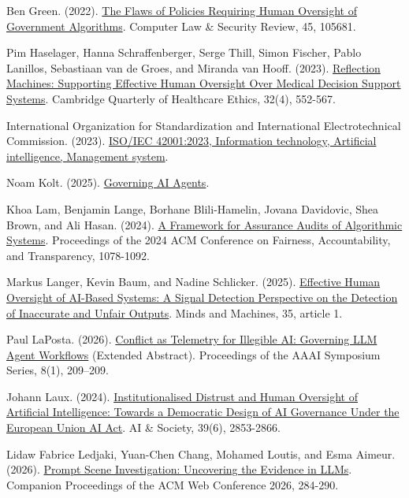\documentclass[11pt]{article}
\newenvironment{TAEReferences}{%
  \begin{list}{}{%
    \renewcommand{\makelabel}[1]{}%
    \setlength{\labelwidth}{0pt}%
    \setlength{\labelsep}{0pt}%
    \setlength{\leftmargin}{0.5in}%
    \setlength{\itemindent}{-0.5in}%
    \setlength{\itemsep}{0.45em}%
    \setlength{\parsep}{0pt}%
    \setlength{\topsep}{0.25em}%
  }%
}{\end{list}}
\begin{document}
\begin{TAEReferences}
\item{}\label{reference-16} Ben Green. (2022). \href{https://doi.org/10.1016/j.clsr.2022.105681}{The Flaws of Policies Requiring Human Oversight of Government Algorithms}. Computer Law \& Security Review, 45, 105681.
\item{}\label{reference-17} Pim Haselager, Hanna Schraffenberger, Serge Thill, Simon Fischer, Pablo Lanillos, Sebastiaan van de Groes, and Miranda van Hooff. (2023). \href{https://doi.org/10.1017/S0963180122000718}{Reflection Machines: Supporting Effective Human Oversight Over Medical Decision Support Systems}. Cambridge Quarterly of Healthcare Ethics, 32(4), 552-567.
\item{}\label{reference-18} International Organization for Standardization and International Electrotechnical Commission. (2023). \href{https://www.iso.org/standard/42001}{ISO/IEC 42001:2023, Information technology, Artificial intelligence, Management system}.
\item{}\label{reference-19} Noam Kolt. (2025). \href{https://arxiv.org/abs/2501.07913}{Governing AI Agents}.
\item{}\label{reference-20} Khoa Lam, Benjamin Lange, Borhane Blili-Hamelin, Jovana Davidovic, Shea Brown, and Ali Hasan. (2024). \href{https://doi.org/10.1145/3630106.3658957}{A Framework for Assurance Audits of Algorithmic Systems}. Proceedings of the 2024 ACM Conference on Fairness, Accountability, and Transparency, 1078-1092.
\item{}\label{reference-21} Markus Langer, Kevin Baum, and Nadine Schlicker. (2025). \href{https://doi.org/10.1007/s11023-024-09701-0}{Effective Human Oversight of AI-Based Systems: A Signal Detection Perspective on the Detection of Inaccurate and Unfair Outputs}. Minds and Machines, 35, article 1.
\item{}\label{reference-22} Paul LaPosta. (2026). \href{https://doi.org/10.1609/aaaiss.v8i1.42543}{Conflict as Telemetry for Illegible AI: Governing LLM Agent Workflows} (Extended Abstract). Proceedings of the AAAI Symposium Series, 8(1), 209--209.
\item{}\label{reference-23} Johann Laux. (2024). \href{https://doi.org/10.1007/s00146-023-01777-z}{Institutionalised Distrust and Human Oversight of Artificial Intelligence: Towards a Democratic Design of AI Governance Under the European Union AI Act}. AI \& Society, 39(6), 2853-2866.
\item{}\label{reference-24} Lidaw Fabrice Ledjaki, Yuan-Chen Chang, Mohamed Loutis, and Esma Aimeur. (2026). \href{https://doi.org/10.1145/3774905.3795469}{Prompt Scene Investigation: Uncovering the Evidence in LLMs}. Companion Proceedings of the ACM Web Conference 2026, 284-290.

\end{TAEReferences}
\end{document}
